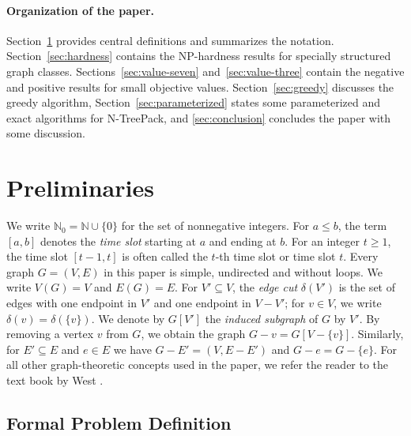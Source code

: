 \documentclass[runningheads]{llncs}
\newcommand{\NN}{\mathbb{N}}
\newcommand{\set}[1]{\{ #1 \}}
\newcommand{\xxxNTP}{{\sc N-TreePack}}
\newcommand{\lasse}[1]{#1}
\begin{document}
\paragraph{Organization of the paper.}
Section~\ref{sec:notation} provides central definitions and summarizes the notation.
Section~\ref{sec:hardness} contains the NP-hardness results for specially structured graph classes. 
Sections~\ref{sec:value-seven} and~\ref{sec:value-three} contain the negative and positive results 
for small objective values. 
Section~\ref{sec:greedy} discusses the greedy algorithm, 
Section~\ref{sec:parameterized} states some parameterized and exact algorithms for {\xxxNTP}, and
\cref{sec:conclusion} concludes the paper with some discussion.


\section{Preliminaries}
\label{sec:notation}

We write $\NN_0= \NN \cup \set{0}$ for the set of nonnegative integers. 
For $a\le b$, the term $[a,b]$ denotes the \emph{time slot} starting at $a$ and ending at $b$. 
For \lasse{an integer} $t\ge1$, the time slot $[t-1,t]$ is often called the $t$-th time slot or time slot $t$.
Every graph $G=(V,E)$ in this paper is simple, undirected and without loops. We write $V(G) = V$ and $E(G) = E$.
For $V'\subseteq V$, the \emph{edge cut} $\delta(V')$ is the set of edges with one endpoint 
in $V'$ and one endpoint in $V-V'$; for $v\in V$, we write $\delta(v) = \delta(\set{v})$.
We denote by $G[V']$ the \emph{induced subgraph} \lasse{of $G$ by} $V'$.
By removing \lasse{a} vertex $v$ from $G$, we obtain the graph $G-v=G[V-\set{v}]$.
Similarly, for $E'\subseteq E$ and $e\in E$ we have $G-E'=(V,E-E')$ and $G-e=G-\set{e}$. For all other graph-theoretic concepts used in the paper, we refer the reader to the
text book by West \cite{WestBook}.

\subsection{Formal Problem Definition}
\end{document}
